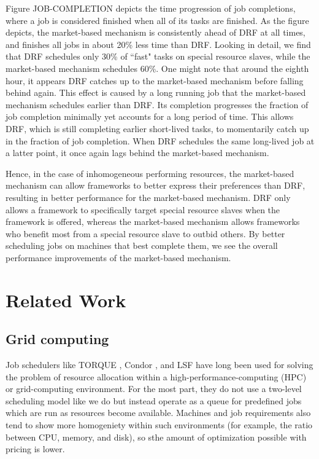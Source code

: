 \documentclass{acm_proc_article-sp}
\begin{document}
Figure JOB-COMPLETION depicts the time progression of job completions, where a job is considered finished when all of its tasks are finished. As the figure depicts, the market-based mechanism is consistently ahead of DRF at all times, and finishes all jobs in about 20\% less time than DRF. Looking in detail, we find that DRF schedules only 30\% of ``fast" tasks on special resource slaves, while the market-based mechanism schedules 60\%. One might note that around the eighth hour, it appears DRF catches up to the market-based mechanism before falling behind again. This effect is caused by a long running job that the market-based mechanism schedules earlier than DRF. Its completion progresses the fraction of job completion minimally yet accounts for a long period of time. This allows DRF, which is still completing earlier short-lived tasks, to momentarily catch up in the fraction of job completion. When DRF schedules the same long-lived job at a latter point, it once again lags behind the market-based mechanism.

Hence, in the case of inhomogeneous performing resources, the market-based mechanism can allow frameworks to better express their preferences than DRF, resulting in better performance for the market-based mechanism. DRF only allows a framework to specifically target special resource slaves when the framework is offered, whereas the market-based mechanism allows frameworks who benefit most from a special resource slave to outbid others. By better scheduling jobs on machines that best complete them, we see the overall performance improvements of the market-based mechanism.

\section{Related Work}
\subsection{Grid computing}
Job schedulers like TORQUE \cite{torque}, Condor \cite{condor}, and LSF
\cite{lsf} have long been used for solving the problem of resource allocation
within a high-performance-computing (HPC) or grid-computing environment.
For the most part, they do not use a two-level scheduling model like we do but
instead operate as a queue for predefined jobs which are run as resources become
available. Machines and job requirements also tend to show more homogeniety
within such environments (for example, the ratio between CPU, memory, and disk),
so sthe amount of optimization possible with pricing is lower.
\end{document}

